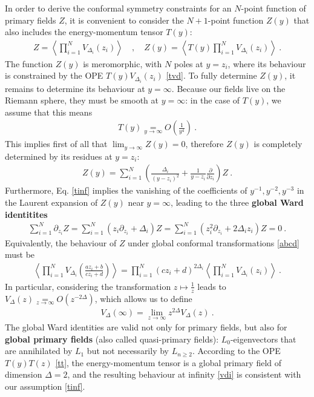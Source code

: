 \documentclass[12pt, a4paper]{article}
\theoremstyle{break}
\begin{document}
In order to derive the conformal symmetry constraints for an $N$-point function of primary fields $Z$, it is convenient to consider the $N+1$-point function $Z(y)$ that also includes the energy-momentum tensor $T(y)$:
\begin{align}
 Z = \left< \prod_{i=1}^N V_{\Delta_i}(z_i)\right> \quad , \quad Z(y) = \left< T(y)\prod_{i=1}^N V_{\Delta_i}(z_i)\right>\ .
\end{align}
The function $Z(y)$ is meromorphic, with $N$ poles at $y=z_i$, where its behaviour is constrained by the OPE $T(y)V_{\Delta_i}(z_i)$ \eqref{tvd}. To fully determine $Z(y)$, it remains to determine its behaviour at $y=\infty$. Because our fields live on the Riemann sphere, they must be smooth at $y=\infty$: in the case of $T(y)$, we assume that this means 
\begin{align}
 T(y) \underset{y\to\infty} = O\left(\frac{1}{y^4}\right)\ .
 \label{tinf}
\end{align}
This implies first of all that $\lim_{y\to \infty} Z(y)=0$, therefore $Z(y)$ is completely determined by its residues at $y=z_i$:
\begin{align}
 Z(y) = \sum_{i=1}^N \left(\frac{\Delta_i}{(y-z_i)^2} +\frac{1}{y-z_i}\frac{\partial}{\partial z_i}\right) Z\ .
 \label{zy}
\end{align}
Furthermore, Eq. \eqref{tinf} implies the vanishing of the coefficients of $y^{-1},y^{-2},y^{-3}$ in the Laurent expansion of $Z(y)$ near $y=\infty$, leading to the three \textbf{global Ward identitites} 
\begin{align}
 \sum_{i=1}^N \partial_{z_i} Z = \sum_{i=1}^N \left(z_i \partial_{z_i} + \Delta_i\right) Z = \sum_{i=1}^N \left(z_i^2 \partial_{z_i} + 2\Delta_iz_i\right) Z = 0\ .
 \label{gward}
\end{align}
Equivalently, the behaviour of $Z$ under global conformal transformations \eqref{abcd} must be
\begin{align}
 \left< \prod_{i=1}^N  V_{\Delta_i}\left(\frac{az_i+b}{cz_i+d}\right) \right>
 = \prod_{i=1}^N (cz_i +d)^{2\Delta_i} \left< \prod_{i=1}^N V_{\Delta_i}(z_i) \right>\ .
 \label{zgc}
\end{align}
In particular, considering the transformation $z\mapsto \frac{1}{z}$ leads to $V_\Delta(z)\underset{z\to\infty}{=} O(z^{-2\Delta})$, which allows us to define 
\begin{align}
 V_\Delta(\infty) = \lim_{z\to\infty} z^{2\Delta}V_\Delta(z)\ . 
 \label{vdi}
\end{align}
The global Ward identities are valid not only for primary fields, but also for \textbf{global primary fields} (also called quasi-primary fields): $L_0$-eigenvectors that are annihilated by $L_1$ but not necessarily by $L_{n\geq 2}$. According to the OPE $T(y)T(z)$ \eqref{tt}, the energy-momentum tensor is a global primary field of dimension $\Delta=2$, and the resulting behaviour at infinity \eqref{vdi} is consistent with our assumption \eqref{tinf}. 
\end{document}
